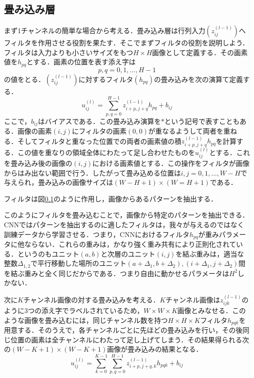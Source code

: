 \documentclass[a4paper,11pt]{jsreport}
\begin{document}
\subsection{畳み込み層}
まず1チャンネルの簡単な場合から考える．畳み込み層は行列入力$(z_{ij}^{(l-1)})$へフィルタを作用させる役割を果たす．そこでまずフィルタの役割を説明しよう．フィルタは入力よりも小さいサイズをもつ$H \times H$画像として定義する．その画素値を$h_{pq}$とする．画素の位置を表す添え字は
\begin{equation}
  p,q = 0,1,\dots,H-1
\end{equation}
の値をとる．$(z_{ij}^{(l-1)})$に対するフィルタ$(h_{pq})$の畳み込みを次の演算て定義する．
\begin{equation}
  u_{ij}^{(l)}
  = \sum_{p,q=0}^{H-1} z_{i+p,j+q}^{(l-1)} h_{pq} + b_{ij}
\end{equation}
ここで，$b_{ij}$はバイアスである．この畳み込み演算を$\ast$という記号で表すこともある．画像の画素$(i,j)$にフィルタの画素$(0,0)$が重なるようして両者を重ねる．そしてフィルタと重なった位置での両者の画素値の積$z_{i+p,j+q}^{(l-1)} h_{pq}$を計算する．この値を重なりの領域全体にわたって足し合わせたものを$u_{ij}^{(l)}$とする．これを畳み込み後の画像の$(i,j)$における画素値とする．この操作をフィルタが画像からはみ出ない範囲で行う．したがって畳み込める位置は$i,j=0,1,\dots,W-H$で与えられ，畳み込みの画像サイズは$(W-H+1)\times(W=H+1)$である．\par
フィルタは図\ref{}のように作用し，画像からあるパターンを抽出する．\par
このようにフィルタを畳み込むことで，画像から特定のパターンを抽出できる．CNNではパターンを抽出するのに適したフィルタは，我々が与えるのではなく訓練データから学習させる．つまり，CNNにおけるフィルタ$h_{pq}$が重みパラメータに他ならない．これらの重みは，かなり強く重み共有により正則化されている．というのもユニット$(a,b)$と次層のユニット$(i,j)$を結ぶ重みは，適当な整数$\Delta_{1,2}$で平行移動した場所のユニット$(a+\Delta_1,b+\Delta_2),(i+\Delta_1,j+\Delta_2)$間を結ぶ重みと全く同じだからである．つまり自由に動かせるパラメータは$H^2$しかない．\par
次に$K$チャンネル画像の対する畳み込みを考える．$K$チャンネル画像は$z_{ijk}^{(l-1)}$のように3つの添え字でラベルされているため，$W \times W \times K$画像とみなせる．このような画像を畳み込むには，同じチャンネル数を持つ$H \times H \times K$フィルタ$h_{pqk}$を用意する．そのうえで，各チャンネルごとに先ほどの畳み込みを行い，その後同じ位置の画素は全チャンネルにわたって足し上げてしまう．その結果得られる次の$(W-K+1)\times(W-K+1)$画像が畳み込みの結果となる．
\begin{equation}
  u_{ij}^{(l)}
  = \sum_{k=0}^{K-1}\sum_{p,q=0}^{H-1} z_{i+p,j+q,k}^{(l-1)} h_{pqk} + b_{ij}
\end{equation} \par
\end{document}
